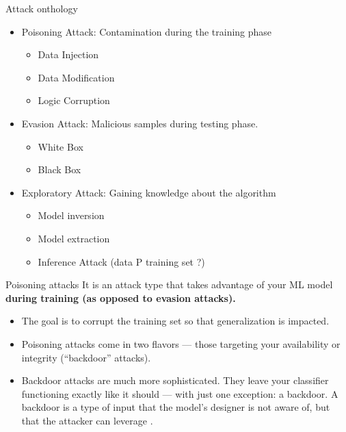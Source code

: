 \documentclass{beamer}
\begin{document}
\begin{frame}{Attack onthology}
    \begin{itemize}
        
        \item Poisoning Attack: Contamination during the training phase
        \begin{itemize}
            \item Data Injection
            \item Data Modification
            \item Logic Corruption
        \end{itemize}
        
        \vspace{0.5cm}
        \item Evasion Attack: Malicious samples during testing phase. 
        \begin{itemize}
            \item White Box
            \item Black Box
        \end{itemize}
        
        \vspace{0.5cm}
        \item Exploratory Attack: Gaining knowledge about the algorithm
        \vspace{-0.5cm}
        \begin{itemize}
            \item Model inversion
            \item Model extraction
            \item Inference Attack (data P training set ?)
        \end{itemize}
    \end{itemize}
\end{frame}

\begin{frame}{Poisoning attacks}
    It is an attack type that takes advantage of your ML model \textbf{during training (as opposed to evasion attacks).}
    \begin{itemize}
        \item The goal is to corrupt the training set so that generalization is impacted.
        \item Poisoning attacks come in two flavors — those targeting your availability or integrity (“backdoor” attacks).
        \item Backdoor attacks are much more sophisticated. They leave your classifier functioning exactly like it should — with just one exception: a backdoor. A backdoor is a type of input that the model’s designer is not aware of, but that the attacker can leverage \cite{chen2017targeted}. 
    \end{itemize}
\end{frame}
\end{document}

